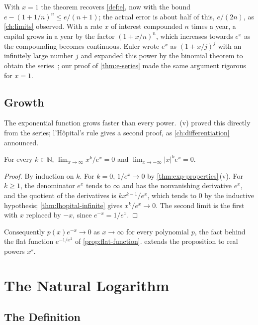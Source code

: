 With $x=1$ the theorem recovers \cref{def:e}, now with the bound $e-(1+1/n)^n\le e/(n+1)$; the actual error is about half of this, $e/(2n)$, as \cref{ch:limits} observed. With a rate $x$ of interest compounded $n$ times a year, a capital grows in a year by the factor $(1+x/n)^n$, which increases towards $e^x$ as the compounding becomes continuous. Euler wrote $e^x$ as $(1+x/j)^j$ with an infinitely large number $j$ and expanded this power by the binomial theorem to obtain the series~\cite{euler1748introductio}; our proof of \cref{thm:e-series} made the same argument rigorous for $x=1$.

\subsection{Growth}

The exponential function grows faster than every power. \,(v) proved this directly from the series; l'H\^opital's rule gives a second proof, as \cref{ch:differentiation} announced.

\begin{proposition}
\label{prop:exp-growth}
For every $k\in\mathbb N$, $\lim_{x\to\infty}x^k/e^x=0$ and $\lim_{x\to-\infty}|x|^ke^x=0$.
\end{proposition}

\begin{proof}
By induction on $k$. For $k=0$, $1/e^x\to0$ by \cref{thm:exp-properties}\,(v). For $k\ge1$, the denominator $e^x$ tends to $\infty$ and has the nonvanishing derivative $e^x$, and the quotient of the derivatives is $kx^{k-1}/e^x$, which tends to $0$ by the inductive hypothesis; \cref{thm:lhopital-infinite} gives $x^k/e^x\to0$. The second limit is the first with $x$ replaced by $-x$, since $e^{-x}=1/e^x$.
\end{proof}

Consequently $p(x)e^{-x}\to0$ as $x\to\infty$ for every polynomial $p$, the fact behind the flat function $e^{-1/x^2}$ of \cref{prop:flat-function}.  extends the proposition to real powers $x^s$.

\section{The Natural Logarithm}
\label{sec:log-function}

\subsection{The Definition}

